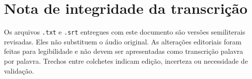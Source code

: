 \documentclass[12pt,a4paper]{article}
\begin{document}
\section{Nota de integridade da transcrição}
Os arquivos \texttt{.txt} e \texttt{.srt} entregues com este documento são versões semiliterais revisadas. Eles não substituem o áudio original. As alterações editoriais foram feitas para legibilidade e não devem ser apresentadas como transcrição palavra por palavra. Trechos entre colchetes indicam edição, incerteza ou necessidade de validação.
\end{document}
